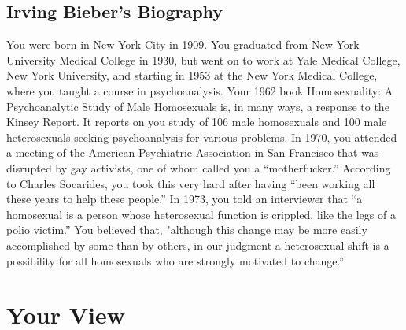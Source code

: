 \subsection{Irving Bieber's Biography}
\label{irvingbiebersbiography}

You were born in New York City in 1909. You graduated from New York University Medical College in 1930, but went on to work at Yale Medical College, New York University, and starting in 1953 at the New York Medical College, where you taught a course in psychoanalysis. Your 1962 book Homosexuality: A Psychoanalytic Study of Male Homosexuals is, in many ways, a response to the Kinsey Report. It reports on you study of 106 male homosexuals and 100 male heterosexuals seeking psychoanalysis for various problems.
In 1970, you attended a meeting of the American Psychiatric Association in San Francisco that was disrupted by gay activists, one of whom called you a ``motherfucker.'' According to Charles Socarides, you took this very hard after having ``been working all these years to help these people.'' In 1973, you told an interviewer that ``a homosexual is a person whose heterosexual function is crippled, like the legs of a polio victim.'' You believed that, "although this change may be more easily accomplished by some than by others, in our judgment a heterosexual shift is a possibility for all homosexuals who are strongly motivated to change.”

\section{Your View}
\label{yourview}


